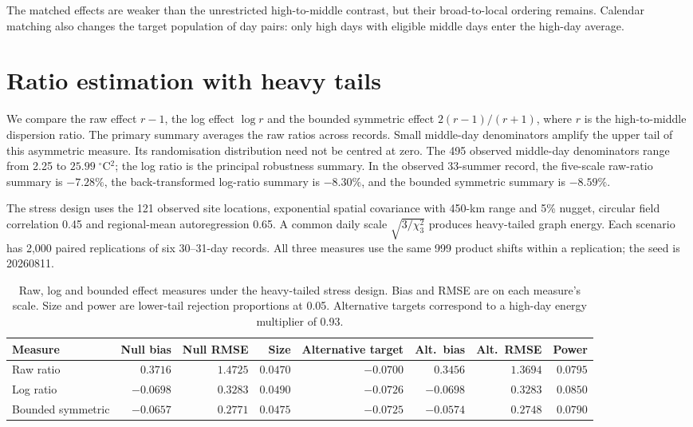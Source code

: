 \documentclass[namedate,webpdf,modern,mediumone]{oup-authoring-template}
\theoremstyle{thmstyleone}
\begin{document}
The matched effects are weaker than the unrestricted high-to-middle contrast,
but their broad-to-local ordering remains. Calendar matching also changes the
target population of day pairs: only high days with eligible middle days enter
the high-day average.

\section{Ratio estimation with heavy tails}
\label{sec:ratio-stress}

We compare the raw effect $r-1$, the log effect $\log r$ and the bounded
symmetric effect $2(r-1)/(r+1)$, where $r$ is the high-to-middle dispersion
ratio. The primary summary averages the raw ratios across records. Small
middle-day denominators amplify the upper tail of this asymmetric measure. Its randomisation distribution need not be centred at
zero. The 495 observed middle-day denominators range from 2.25 to
$25.99\;{}^\circ$C$^2$; the log ratio is the principal robustness summary.
In the observed 33-summer record, the five-scale raw-ratio summary is
$-7.28\%$, the back-transformed log-ratio summary is $-8.30\%$, and the
bounded symmetric summary is $-8.59\%$.

The stress design uses the 121 observed site locations, exponential
spatial covariance with 450-km range and 5\% nugget, circular field
correlation 0.45 and regional-mean autoregression 0.65. A common daily scale
$\sqrt{3/\chi^2_3}$ produces heavy-tailed graph energy. Each scenario has
2,000 paired replications of six 30--31-day records. All three measures use
the same 999 product shifts within a replication; the seed is 20260811.

\begin{table}[htbp]
\centering
\caption{Raw, log and bounded effect measures under the heavy-tailed stress
design. Bias and RMSE are on each measure's scale. Size and power are
lower-tail rejection proportions at 0.05. Alternative targets correspond to
a high-day energy multiplier of 0.93.}
\label{tab:ratio-stress}
\scriptsize
\setlength{\tabcolsep}{3pt}
\begin{tabular}{lrrrrrrr}
\toprule
Measure & Null bias & Null RMSE & Size & Alternative target & Alt.~bias & Alt.~RMSE & Power \\
\midrule
Raw ratio         & $0.3716$  & $1.4725$ & $0.0470$ & $-0.0700$ & $0.3456$  & $1.3694$ & $0.0795$ \\
Log ratio         & $-0.0698$ & $0.3283$ & $0.0490$ & $-0.0726$ & $-0.0698$ & $0.3283$ & $0.0850$ \\
Bounded symmetric & $-0.0657$ & $0.2771$ & $0.0475$ & $-0.0725$ & $-0.0574$ & $0.2748$ & $0.0790$ \\
\bottomrule
\end{tabular}
\end{table}
\end{document}
